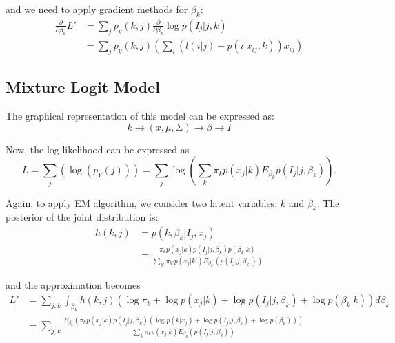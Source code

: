 \documentclass[english]{article}
\begin{document}
\noindent and we need to apply gradient methods for $\beta_k$:
\begin{equation}\nonumber
  \begin{aligned}
    \frac{\partial}{\partial \beta_k}L' & = \sum_j p_y(k,j)\frac{\partial}{\partial \beta_k}\log p(I_j|j,k) \\
    & = \sum_j p_y(k,j)(\sum_i(l(i|j)-p(i|x_{ij},k))x_{ij})
  \end{aligned}
\end{equation}

\subsection{Mixture Logit Model}

The graphical representation of this model can be expressed as:
\begin{equation}\nonumber
  k \to (x,\mu,\Sigma) \to \beta \to I
\end{equation}

Now, the log likelihood can be expressed as
\begin{equation}\nonumber
  L = \sum_j(\log(p_Y(j))) = \sum_j\log(\sum_k \pi_kp(x_j|k)E_{\beta_k}p(I_j|j,\beta_k)).
\end{equation}

Again, to apply EM algorithm, we consider two latent variables: $k$ and $\beta_k$. The posterior of the joint distribution is:
\begin{equation}\nonumber
  \begin{aligned}
    h(k,j) & = p(k,\beta_k|I_j,x_j)\\
    & = \frac{\pi_kp(x_j|k)p(I_j|j,\beta_k)p(\beta_k|k)}{\sum_{k'}\pi_{k'}p(x_j|k')E_{\beta_{k'}}(p(I_j|j,\beta_{k'}))}
  \end{aligned}
\end{equation}

\noindent and the approximation becomes
\begin{equation}
  \begin{aligned}
    L' & = \sum_{j,k}\int_{\beta_k} h(k,j)(\log \pi_k + \log p(x_j|k) + \log p(I_j|j,\beta_k)+\log p(\beta_k|k))d\beta_k \\
    & = \sum_{j,k}\frac{E_{\beta_k} (\pi_kp(x_j|k)p(I_j|j,\beta_k)(\log p(k|x_j) + \log p(I_j|j,\beta_k)+\log p(\beta_k)))}{\sum_{k}\pi_kp(x_j|k)E_{\beta_{k}}(p(I_j|j,\beta_{k}))}\\
  \end{aligned}
\end{equation}
\end{document}
